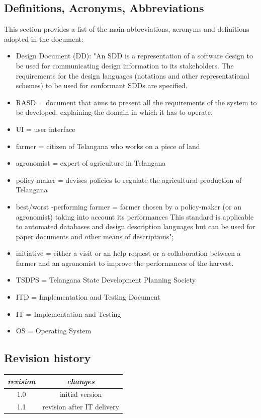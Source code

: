 \documentclass{article}
\begin{document}
\subsection{Definitions, Acronyms, Abbreviations}\label{Abbreviations}
This section provides a list of the main abbreviations, acronyms and definitions adopted in the document:
\begin{itemize}
    \item Design Document (DD): "An SDD is a representation of a software design to be used for communicating design information to its stakeholders. The requirements for the design languages (notations and other representational schemes) to be used for conformant SDDs are specified.
    \item RASD = document that aims to present all the requirements of the system to
be developed, explaining the domain in which it has to operate.
    \item UI = user interface
    \item farmer = citizen of Telangana who works on a piece of land
    \item agronomist = expert of agriculture in Telangana
    \item policy-maker = devises policies to regulate the agricultural production of
    Telangana
    \item best/worst -performing farmer = farmer chosen by a policy-maker (or an
agronomist) taking into account its performances
This standard is applicable to automated databases and design description languages but can be
used for paper documents and other means of descriptions";
\item initiative = either a visit or an help request or a collaboration between a farmer and an agronomist to improve the performances of the harvest.
\item TSDPS = Telangana State Development Planning Society
\item ITD = Implementation and Testing Document
\item IT = Implementation and Testing
\item OS = Operating System
\end{itemize}

\subsection{Revision history}
\raggedright
\begin{tabular}{ |c | c |}
\hline
 \textit{revision} & \textit{changes} \\ 
 \hline
 1.0 &  initial version\\ 
 \hline
  1.1 &  revision after IT delivery\\ 
 \hline
\end{tabular}
\end{document}
